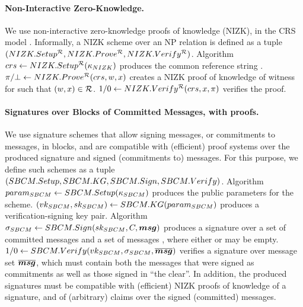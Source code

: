 \paragraph{Non-Interactive Zero-Knowledge.} %
We use non-interactive zero-knowledge proofs of knowledge (NIZK), in the CRS
model \needcite. Informally, a NIZK scheme over an NP relation \NIZKRel is
defined as a tuple $(NIZK.Setup^\mathcal{R},NIZK.Prove^\mathcal{R},
NIZK.Verify^\mathcal{R})$. Algorithm $crs \gets NIZK.Setup^\mathcal{R}
(\kappa_{NIZK})$ produces the common reference string \NIZKcrs. $\pi/\bot
\gets NIZK.Prove^\mathcal{R}(crs,w,x)$ creates a NIZK proof of
knowledge of witness \NIZKw for \NIZKx such that $(w,x) \in \mathcal{R}$.
$1/0 \gets NIZK.Verify^\mathcal{R}(crs,x,\pi)$ verifies the proof.

\paragraph{Signatures over Blocks of Committed Messages, with proofs.} %
We use signature schemes that allow signing messages, or commitments to messages,
in blocks, and are compatible with (efficient) proof systems over the produced
signature and signed (commitments to) messages. For this purpose, we define such
schemes as a tuple $(SBCM.Setup,SBCM.KG,SBCM.Sign,SBCM.Verify)$. Algorithm
$param_{SBCM} \gets SBCM.Setup(\kappa_{SBCM})$ produces the public parameters for the
scheme. $(vk_{SBCM},sk_{SBCM}) \gets SBCM.KG(param_{SBCM})$ produces a
verification-signing key
pair. Algorithm $\sigma_{SBCM} \gets SBCM.Sign(sk_{SBCM},C,\boldsymbol{msg})$ produces a
signature over a set of committed messages \Ccom and a set of messages
\msgset, where either \Ccom or \msgset may be empty. $1/0 \gets
SBCM.Verify(vk_{SBCM},\sigma_{SBCM},\overline{\boldsymbol{msg}})$ verifies a signature \SBCMsig
over message set $\overline{\boldsymbol{msg}}$, which must contain both the messages that
were signed as commitments as well as those signed in ``the clear''. In
addition, the produced signatures must be compatible with (efficient) NIZK
proofs of knowledge of a signature, and of (arbitrary) claims over the signed
(committed) messages.



